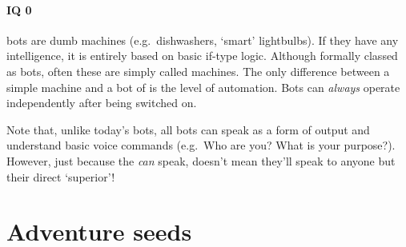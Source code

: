 \documentclass[a4paper,twocolumn]{memoir}
\begin{document}
\subsubsection{IQ 0}
\label{sec:iq-0-3}

 bots are dumb machines (e.g.~dishwashers, `smart' lightbulbs). If they
have any intelligence, it is entirely based on basic if-type logic. Although
formally classed as bots, often these are simply called machines. The only
difference between a simple machine and a bot of  is the level of
automation. Bots can \emph{always} operate independently after being switched
on.

Note that, unlike today's bots, all bots can speak as a form of output and
understand basic voice commands (e.g.~Who are you? What is your purpose?).
However, just because the \emph{can} speak, doesn't mean they'll speak to anyone
but their direct `superior'!


\chapter{Adventure seeds}
\end{document}
